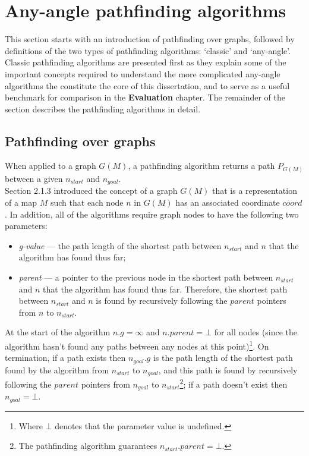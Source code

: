\documentclass[12pt,notitlepage]{report}
\begin{document}
\section{Any-angle pathfinding algorithms}

\noindent
This section starts with an introduction of pathfinding over graphs, followed by definitions of the two types of pathfinding algorithms: `classic' and `any-angle'. Classic pathfinding algorithms are presented first as they explain some of the important concepts required to understand the more complicated any-angle algorithms the constitute the core of this dissertation, and to serve as a useful benchmark for comparison in the {\bfseries Evaluation} chapter. The remainder of the section describes the pathfinding algorithms in detail.
 
\subsection{Pathfinding over graphs}

When applied to a graph $G(M)$, a pathfinding algorithm returns a path $P_{G(M)}$ between a given $n_{start}$ and $n_{goal}$.\\

\noindent
Section 2.1.3 introduced the concept of a graph $G(M)$ that is a representation of a map $M$ such that each node $n$ in $G(M)$ has an associated coordinate $coord$. In addition, all of the algorithms require graph nodes to have the following two parameters:
\begin{itemize}
\item {\em g-value} --- the path length of the shortest path between $n_{start}$ and $n$ that the algorithm has found thus far;
\item {\em parent} --- a pointer to the previous node in the shortest path between $n_{start}$ and $n$ that the algorithm has found thus far. Therefore, the shortest path between $n_{start}$ and $n$ is found by recursively following the $parent$ pointers from $n$ to $n_{start}$.
\end{itemize}

\noindent
At the start of the algorithm $n.g = \infty$ and $n.parent = \bot$ for all nodes (since the algorithm hasn't found any paths between any nodes at this point)\footnote{Where $\bot$ denotes that the parameter value is undefined.}. On termination, if a path exists then $n_{goal}.g$ is the path length of the shortest path found by the algorithm from $n_{start}$ to $n_{goal}$, and this path is found by recursively following the $parent$ pointers from $n_{goal}$ to $n_{start}$\footnote{The pathfinding algorithm guarantees $n_{start}.parent = \bot$.}; if a path doesn't exist then $n_{goal} = \bot$.
\end{document}
